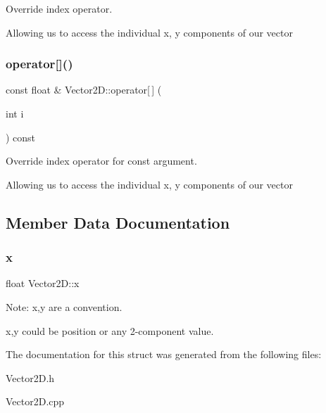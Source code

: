 Override index operator. 

Allowing us to access the individual x, y components of our vector \mbox{\label{struct_vector2_d_a92f3c89557503a377c79ddcf99d9be13}} 
\subsubsection{\texorpdfstring{operator[]()}{operator[]()}\hspace{0.1cm}{\footnotesize\ttfamily [2/2]}}
{\footnotesize\ttfamily const float \& Vector2\+D\+::operator\mbox{[}$\,$\mbox{]} (\begin{DoxyParamCaption}\item[{int}]{i }\end{DoxyParamCaption}) const}



Override index operator for const argument. 

Allowing us to access the individual x, y components of our vector 

\subsection{Member Data Documentation}
\mbox{\label{struct_vector2_d_aeb4253ba6555251d010ea4450619029e}} 
\subsubsection{\texorpdfstring{x}{x}}
{\footnotesize\ttfamily float Vector2\+D\+::x}



Note\+: x,y are a convention. 

x,y could be position or any 2-\/component value. 

The documentation for this struct was generated from the following files\+:\begin{DoxyCompactItemize}
\item 
Vector2\+D.\+h\item 
Vector2\+D.\+cpp\end{DoxyCompactItemize}
